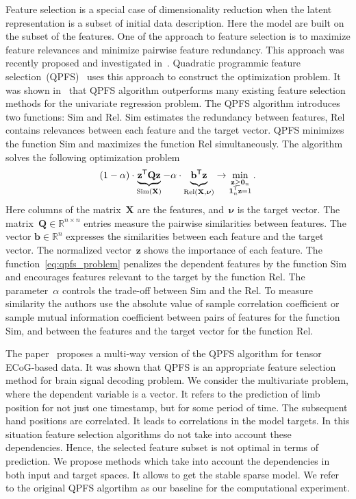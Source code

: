 \documentclass[12pt,twoside]{article}
\theoremstyle{definition}
\newcommand{\bz}{\mathbf{z}}
\newcommand{\bb}{\mathbf{b}}
\newcommand{\bX}{\mathbf{X}}
\newcommand{\bQ}{\mathbf{Q}}
\newcommand{\bbR}{\mathbb{R}}
\newcommand{\T}{\mathsf{T}}
\newcommand{\bnu}{\boldsymbol{\nu}}
\newcommand{\bOne}{\boldsymbol{1}}
\newcommand{\bZero}{\boldsymbol{0}}
\begin{document}
Feature selection is a special case of dimensionality reduction when the latent representation is a subset of initial data description. 
Here the model are built on the subset of the features. 
One of the approach to feature selection is to maximize feature relevances and minimize pairwise feature redundancy. 
This approach was recently proposed and investigated in~\cite{ding2005minimum,yamada2014high}.
Quadratic programmic feature selection~(QPFS)~\cite{rodriguez2010quadratic} uses this approach to construct the optimization problem. It was shown in~\cite{katrutsa2017comprehensive} that QPFS algorithm outperforms many existing feature selection methods for the univariate regression problem. 
The QPFS algorithm introduces two functions: $\text{Sim}$ and $\text{Rel}$.
$\text{Sim}$ estimates the redundancy between features, $\text{Rel}$ contains relevances between each feature and the target vector.
QPFS minimizes the function Sim and maximizes the function Rel simultaneously.
The algorithm solves the following optimization problem
\begin{equation}
(1 - \alpha) \cdot \underbrace{\bz^{\T} \bQ \bz}_{\text{Sim}(\bX)} - \alpha \cdot \underbrace{\vphantom{()} \bb^{\T} \bz}_{\text{Rel} (\bX, \bnu)} \rightarrow \min_{\substack{\bz \geq \bZero_n \\ \bOne_n^{\T} \bz=1}}.
\label{eq:qpfs_problem}
\end{equation}
Here columns of the matrix~$\bX$ are the features, and~$\bnu$ is the target vector. 
The matrix~$\bQ \in \bbR^{n \times n}$ entries measure the pairwise similarities between features.
The vector $\bb \in \bbR^n$ expresses the similarities between each feature and the target vector.
The normalized vector~$\bz$ shows the importance of each feature.
The function~\eqref{eq:qpfs_problem} penalizes the dependent features by the function Sim and encourages features relevant to the target by the function Rel.
The parameter~$\alpha$ controls the trade-off between Sim and the Rel.
To measure similarity the authors use the absolute value of sample correlation coefficient or sample mutual information coefficient between pairs of features for the function Sim, and between the features and the target vector for the function Rel.

The paper~\cite{gasanov2013ecog} proposes a multi-way version of the QPFS algorithm for tensor ECoG-based data. 
It was shown that QPFS is an appropriate feature selection method for brain signal decoding problem.
We consider the multivariate problem, where the dependent variable is a vector. 
It refers to the prediction of limb position for not just one timestamp, but for some period of time. 
The subsequent hand positions are correlated. 
It leads to correlations in the model targets. 
In this situation feature selection algorithms do not take into account these dependencies.
Hence, the selected feature subset is not optimal in terms of prediction.
We propose methods which take into account the dependencies in both input and target spaces. 
It allows to get the stable sparse model.
We refer to the original QPFS algortihm as our baseline for the computational experiment.
\end{document}
